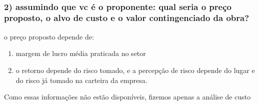 \documentclass[11pt]{article}
\begin{document}
    \begin{center}
    \end{center}
    { \hspace*{\fill} \\}
    
    \subsubsection{2) assumindo que vc é o proponente: qual seria o preço
proposto, o alvo de custo e o valor contingenciado da
obra?}\label{assumindo-que-vc-uxe9-o-proponente-qual-seria-o-preuxe7o-proposto-o-alvo-de-custo-e-o-valor-contingenciado-da-obra}

    o preço proposto depende de:

\begin{enumerate}
\def\labelenumi{\arabic{enumi})}
\item
  margem de lucro média praticada no setor
\item
  o retorno depende do risco tomado, e a percepção de risco depende do
  lugar e do risco já tomado na carteira da empresa.
\end{enumerate}

Como essas informações não estão disponíveis, fizemos apenas a análise
de custo
\end{document}
